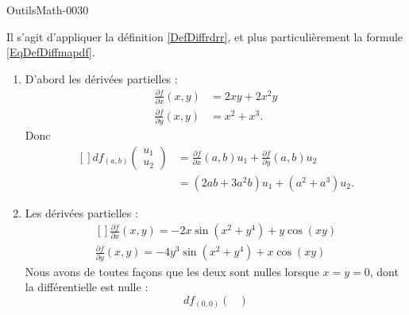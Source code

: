 
\begin{corrige}{OutilsMath-0030}

    Il s'agit d'appliquer la définition \ref{DefDiffrdrr}, et plus particulièrement la formule \eqref{EqDefDiffmapdf}.
    \begin{enumerate}
        \item
            D'abord les dérivées partielles :
            \begin{subequations}
                \begin{align}
                    \frac{ \partial f }{ \partial x }(x,y)&=2xy+2x^2y\\
                    \frac{ \partial f }{ \partial y }(x,y)&=x^2+x^3.
                \end{align}
            \end{subequations}
            Donc
            \begin{equation}
                \begin{aligned}[]
                    df_{(a,b)}\begin{pmatrix}
                        u_1    \\ 
                        u_2    
                    \end{pmatrix}&=\frac{ \partial f }{ \partial x }(a,b)u_1+\frac{ \partial f }{ \partial y }(a,b)u_2\\
                    &=(2ab+3a^2b)u_1+(a^2+a^3)u_2.
                \end{aligned}
            \end{equation}
        \item
            Les dérivées partielles :
            \begin{equation}
                \begin{aligned}[]
                    \frac{ \partial f }{ \partial x }(x,y)=-2x\sin(x^2+y^4)+y\cos(xy)\\
                    \frac{ \partial f }{ \partial y }(x,y)=-4y^3\sin(x^2+y^4)+x\cos(xy)
                \end{aligned}
            \end{equation}
            Nous avons de toutes façons que les deux sont nulles lorsque $x=y=0$, dont la différentielle est nulle :
            \begin{equation}
                df_{(0,0)}\begin{pmatrix}

\end{pmatrix}
\end{equation}
\end{enumerate}
\end{corrige}
